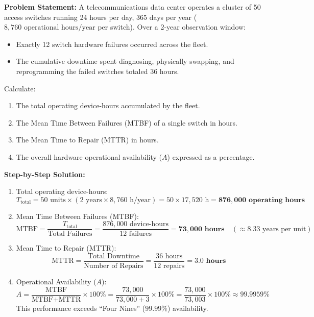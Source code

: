 \begin{tcolorbox}[colback=white,colframe=navyblue,title=\textbf{Problem 12: Reliability Metrics: MTBF, MTTR, and System Availability}]
\textbf{Problem Statement:} A telecommunications data center operates a cluster of 50 access switches running 24 hours per day, 365 days per year ($8,760\text{ operational hours/year}$ per switch). Over a 2-year observation window:
\begin{itemize}
    \item Exactly 12 switch hardware failures occurred across the fleet.
    \item The cumulative downtime spent diagnosing, physically swapping, and reprogramming the failed switches totaled 36 hours.
\end{itemize}
Calculate:
\begin{enumerate}[label=(\alph*),leftmargin=*]
    \item The total operating device-hours accumulated by the fleet.
    \item The Mean Time Between Failures (MTBF) of a single switch in hours.
    \item The Mean Time to Repair (MTTR) in hours.
    \item The overall hardware operational availability ($A$) expressed as a percentage.
\end{enumerate}
\textbf{Step-by-Step Solution:}
\begin{enumerate}[label=(\alph*),leftmargin=*]
    \item Total operating device-hours:
    \[
    T_{\text{total}} = 50\text{ units} \times (2\text{ years} \times 8,760\text{ h/year}) = 50 \times 17,520\text{ h} = \mathbf{876,000\text{ operating hours}}
    \]
    \item Mean Time Between Failures (MTBF):
    \[
    \text{MTBF} = \frac{T_{\text{total}}}{\text{Total Failures}} = \frac{876,000\text{ device-hours}}{12\text{ failures}} = \mathbf{73,000\text{ hours}} \quad (\approx 8.33\text{ years per unit})
    \]
    \item Mean Time to Repair (MTTR):
    \[
    \text{MTTR} = \frac{\text{Total Downtime}}{\text{Number of Repairs}} = \frac{36\text{ hours}}{12\text{ repairs}} = \mathbf{3.0\text{ hours}}
    \]
    \item Operational Availability ($A$):
    \[
    A = \frac{\text{MTBF}}{\text{MTBF} + \text{MTTR}} \times 100\% = \frac{73,000}{73,000 + 3} \times 100\% = \frac{73,000}{73,003} \times 100\% \approx \mathbf{99.9959\%}
    \]
    This performance exceeds ``Four Nines'' ($99.99\%$) availability.
\end{enumerate}
\end{tcolorbox}

